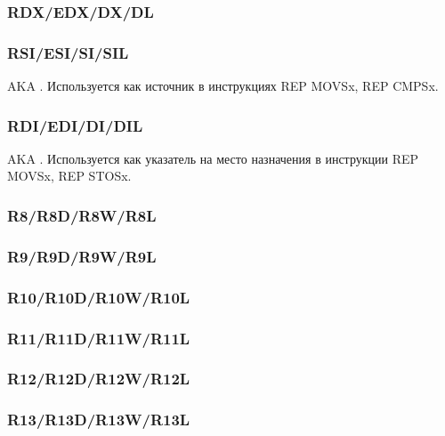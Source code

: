 \subsubsection{RDX/EDX/DX/DL}

\subsubsection{RSI/ESI/SI/SIL}

\ac{AKA} . Используется как источник в инструкциях
REP MOVSx, REP CMPSx.

\subsubsection{RDI/EDI/DI/DIL}

\ac{AKA} . Используется как указатель на место назначения в инструкции
REP MOVSx, REP STOSx.

\subsubsection{R8/R8D/R8W/R8L}

\subsubsection{R9/R9D/R9W/R9L}

\subsubsection{R10/R10D/R10W/R10L}

\subsubsection{R11/R11D/R11W/R11L}

\subsubsection{R12/R12D/R12W/R12L}

\subsubsection{R13/R13D/R13W/R13L}

